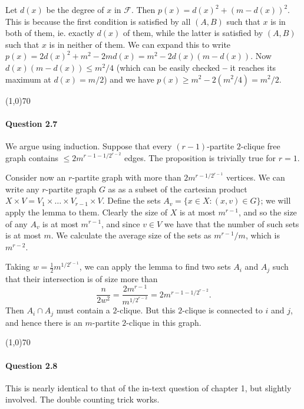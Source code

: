 Let $d(x)$ be the degree of $x$ in $\mathcal{F}$. Then $p(x)=d(x)^2 + (m-d(x))^2$. This is because the first condition is satisfied by all $(A,B)$ such that $x$ is in both of them, ie. exactly $d(x)$ of them, while the latter is satisfied by $(A,B)$ such that $x$ is in neither of them. We can expand this to write $p(x) = 2d(x)^2 + m^2 - 2md(x) = m^2 - 2d(x)(m-d(x))$. Now $d(x)(m-d(x))\leq m^2/4$ (which can be easily checked \textbf{--} it reaches its maximum at $d(x)=m/2$) and we have $p(x)\geq m^2-2(m^2/4)=m^2/2$.

\begin{center}
	\line(1,0){70}
\end{center}

\paragraph{Question 2.7} We argue using induction. Suppose that every $(r-1)$-partite $2$-clique free graph contains $\leq 2m^{r-1-1/2^{r-2}}$ edges. The proposition is trivially true for $r=1$.

Consider now an $r$-partite graph with more than $2m^{r-1/2^{r-1}}$ vertices. We can write any $r$-partite graph $G$ as as a subset of the cartesian product $X \times V = V_1\times\dots\times V_{r-1}\times V$. Define the sets $A_v=\{x\in X:(x,v)\in G\}$; we will apply the lemma to them. Clearly the size of $X$ is at most $m^{r-1}$, and so the size of any $A_v$ is at most $m^{r-1}$, and since $v\in V$ we have that the number of such sets is at most $m$. We calculate the average size of the sets as $m^{r-1}/m$, which is $m^{r-2}$. 

Taking $w=\frac{1}{2}m^{1/2^{r-1}}$, we can apply the lemma to find two sets $A_i$ and $A_j$ such that their intersection is of size more than
$$\frac{n}{2w^{2}}=\frac{2m^{r-1}}{m^{1/2^{r-2}}}=2m^{r-1-1/2^{r-2}}.$$
Then $A_i\cap A_j$ must contain a $2$-clique. But this $2$-clique is connected to $i$ and $j$, and hence there is an $m$-partite $2$-clique in this graph.

\begin{center}
	\line(1,0){70}
\end{center}

\paragraph{Question 2.8} This is nearly identical to that of the in-text question of chapter 1, but slightly involved. The double counting trick works.

